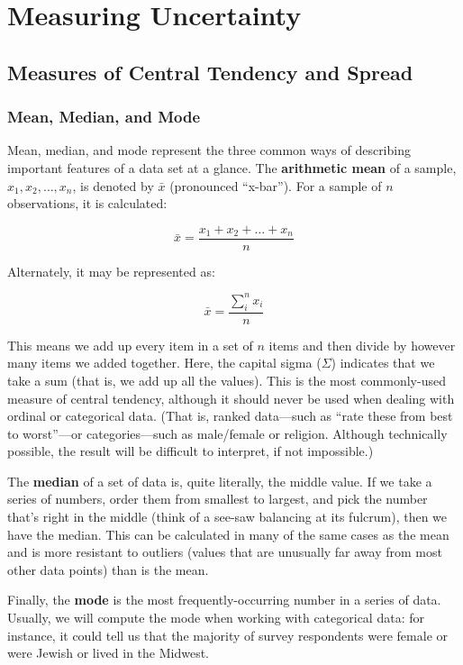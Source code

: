 
\chapter[Measuring Uncertainty]{Measuring Uncertainty}

\section{Measures of Central Tendency and Spread}
\subsection{Mean, Median, and Mode}
Mean, median, and mode represent the three common ways of describing important features of a data set at a glance. The \textbf{arithmetic mean} of a sample, $x_1, x_2, \ldots, x_n$, is denoted by $\bar{x}$ (pronounced ``x-bar''). For a sample of $n$ observations, it is calculated:

\begin{equation*}
\bar{x} = \frac{x_1 +x_2+\ldots +x_n}{n}
\end{equation*}

Alternately, it may be represented as:

\begin{equation}
\bar{x} = \frac{\sum_i^n x_i}{n}
\end{equation}

This means we add up every item in a set of $n$ items and then divide by however many items we added together. Here, the capital sigma ($\Sigma$) indicates that we take a sum (that is, we add up all the values). This is the most commonly-used measure of central tendency, although it should never be used when dealing with ordinal or categorical data. (That is, ranked data---such as ``rate these from best to worst''---or categories---such as male/female or religion. Although technically possible, the result will be difficult to interpret, if not impossible.)

The \textbf{median} of a set of data is, quite literally, the middle value. If we take a series of numbers, order them from smallest to largest, and pick the number that's right in the middle (think of a see-saw balancing at its fulcrum), then we have the median. This can be calculated in many of the same cases as the mean and is more resistant to outliers (values that are unusually far away from most other data points) than is the mean.

Finally, the \textbf{mode} is the most frequently-occurring number in a series of data. Usually, we will compute the mode when working with categorical data: for instance, it could tell us that the majority of survey respondents were female or were Jewish or lived in the Midwest.

